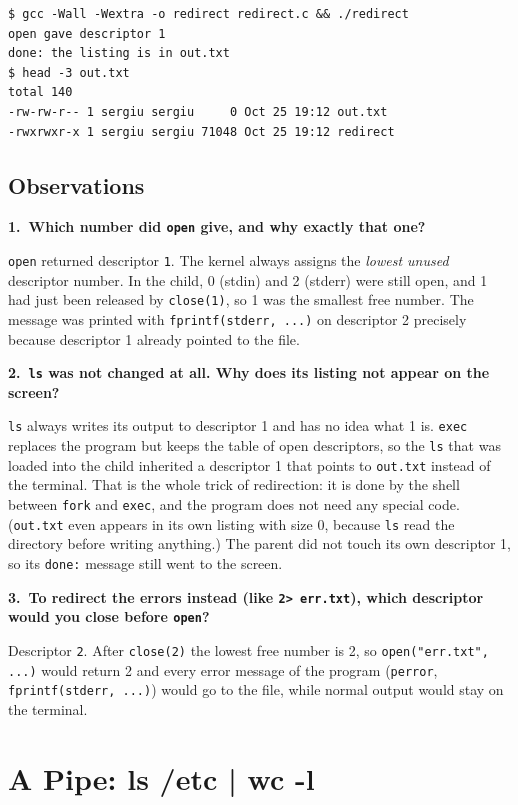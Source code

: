 \documentclass[12pt,a4paper]{article}
\newcommand{\qa}[2]{%
  \par\needspace{5\baselineskip}\medskip
  \noindent\textbf{#1.~#2}\par\smallskip\noindent}
\begin{document}
\begin{lstlisting}[style=terminal,caption={Running redirect and reading out.txt}]
$ gcc -Wall -Wextra -o redirect redirect.c && ./redirect
open gave descriptor 1
done: the listing is in out.txt
$ head -3 out.txt
total 140
-rw-rw-r-- 1 sergiu sergiu     0 Oct 25 19:12 out.txt
-rwxrwxr-x 1 sergiu sergiu 71048 Oct 25 19:12 redirect
\end{lstlisting}

\subsection*{Observations}

\qa{1}{Which number did \texttt{open} give, and why exactly that one?}
\texttt{open} returned descriptor \texttt{1}. The kernel always assigns the \textit{lowest unused} descriptor number. In the child, 0 (stdin) and 2 (stderr) were still open, and 1 had just been released by \texttt{close(1)}, so 1 was the smallest free number. The message was printed with \texttt{fprintf(stderr, ...)} on descriptor 2 precisely because descriptor 1 already pointed to the file.

\qa{2}{\texttt{ls} was not changed at all. Why does its listing not appear on the screen?}
\texttt{ls} always writes its output to descriptor 1 and has no idea what 1 is. \texttt{exec} replaces the program but keeps the table of open descriptors, so the \texttt{ls} that was loaded into the child inherited a descriptor 1 that points to \texttt{out.txt} instead of the terminal. That is the whole trick of redirection: it is done by the shell between \texttt{fork} and \texttt{exec}, and the program does not need any special code. (\texttt{out.txt} even appears in its own listing with size 0, because \texttt{ls} read the directory before writing anything.) The parent did not touch its own descriptor 1, so its \texttt{done:} message still went to the screen.

\qa{3}{To redirect the errors instead (like \texttt{2> err.txt}), which descriptor would you close before \texttt{open}?}
Descriptor \texttt{2}. After \texttt{close(2)} the lowest free number is 2, so \texttt{open("err.txt", ...)} would return 2 and every error message of the program (\texttt{perror}, \texttt{fprintf(stderr, ...)}) would go to the file, while normal output would stay on the terminal.

\newpage
\section{A Pipe: ls /etc | wc -l}
\end{document}
